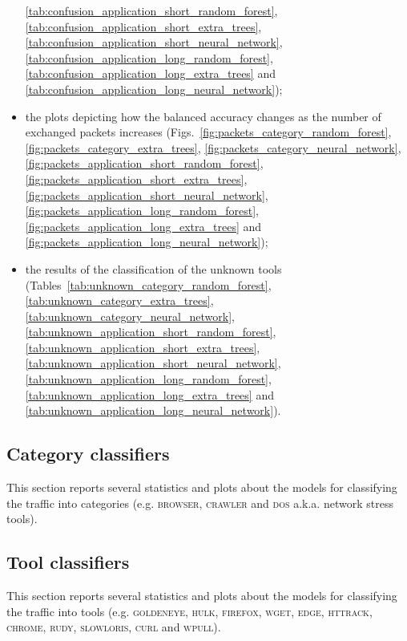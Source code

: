 \documentclass[times,review]{article}
\begin{document}
\begin{itemize}
    \ref{tab:confusion_application_short_random_forest}, \ref{tab:confusion_application_short_extra_trees},
    \ref{tab:confusion_application_short_neural_network}, \ref{tab:confusion_application_long_random_forest},
    \ref{tab:confusion_application_long_extra_trees} and \ref{tab:confusion_application_long_neural_network});
    \item the plots depicting how the balanced accuracy changes as the number of exchanged packets increases
    (Figs.~\ref{fig:packets_category_random_forest}, \ref{fig:packets_category_extra_trees},
    \ref{fig:packets_category_neural_network}, \ref{fig:packets_application_short_random_forest},
    \ref{fig:packets_application_short_extra_trees}, \ref{fig:packets_application_short_neural_network},
    \ref{fig:packets_application_long_random_forest}, \ref{fig:packets_application_long_extra_trees} and
    \ref{fig:packets_application_long_neural_network});
    \item the results of the classification of the unknown tools (Tables~\ref{tab:unknown_category_random_forest},
    \ref{tab:unknown_category_extra_trees}, \ref{tab:unknown_category_neural_network},
    \ref{tab:unknown_application_short_random_forest}, \ref{tab:unknown_application_short_extra_trees},
    \ref{tab:unknown_application_short_neural_network}, \ref{tab:unknown_application_long_random_forest},
    \ref{tab:unknown_application_long_extra_trees} and \ref{tab:unknown_application_long_neural_network}).
\end{itemize}

\subsection*{Category classifiers}

This section reports several statistics and plots about the models for classifying the traffic into categories
(e.g. \textsc{browser}, \textsc{crawler} and \textsc{dos} a.k.a. network stress tools).




\subsection*{Tool classifiers}

This section reports several statistics and plots about the models for classifying the traffic into tools
(e.g. \textsc{goldeneye}, \textsc{hulk}, \textsc{firefox}, \textsc{wget}, \textsc{edge}, \textsc{httrack},
\textsc{chrome}, \textsc{rudy}, \textsc{slowloris}, \textsc{curl} and \textsc{wpull}).



\end{document}
